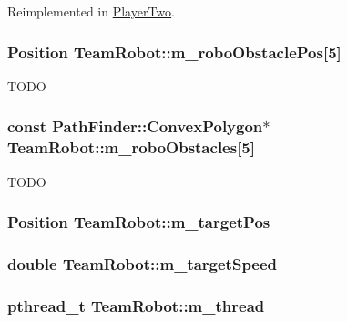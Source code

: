 Reimplemented in \hyperlink{classPlayerTwo_ac2f70709bd48ad9f5c2435cbff1e65b3}{PlayerTwo}.

\hypertarget{classTeamRobot_a5337cff2b594fd63b2445c1d49374d7e}{
\subsubsection[{m\_\-roboObstaclePos}]{\setlength{\rightskip}{0pt plus 5cm}Position {\bf TeamRobot::m\_\-roboObstaclePos}\mbox{[}5\mbox{]}}}
\label{classTeamRobot_a5337cff2b594fd63b2445c1d49374d7e}
TODO \hypertarget{classTeamRobot_a9dc410e800f251d62dbde6b3791b2009}{
\subsubsection[{m\_\-roboObstacles}]{\setlength{\rightskip}{0pt plus 5cm}const {\bf PathFinder::ConvexPolygon}$\ast$ {\bf TeamRobot::m\_\-roboObstacles}\mbox{[}5\mbox{]}}}
\label{classTeamRobot_a9dc410e800f251d62dbde6b3791b2009}
TODO \hypertarget{classTeamRobot_ab7446260b71870667a83b8c53e1274be}{
\subsubsection[{m\_\-targetPos}]{\setlength{\rightskip}{0pt plus 5cm}Position {\bf TeamRobot::m\_\-targetPos}}}
\label{classTeamRobot_ab7446260b71870667a83b8c53e1274be}
\hypertarget{classTeamRobot_aaea621727542377ed5d5e1a316c5293c}{
\subsubsection[{m\_\-targetSpeed}]{\setlength{\rightskip}{0pt plus 5cm}double {\bf TeamRobot::m\_\-targetSpeed}}}
\label{classTeamRobot_aaea621727542377ed5d5e1a316c5293c}
\hypertarget{classTeamRobot_a3e9052964ba03b6dce4a34d1e45dbb1f}{
\subsubsection[{m\_\-thread}]{\setlength{\rightskip}{0pt plus 5cm}pthread\_\-t {\bf TeamRobot::m\_\-thread}}}
\label{classTeamRobot_a3e9052964ba03b6dce4a34d1e45dbb1f}


